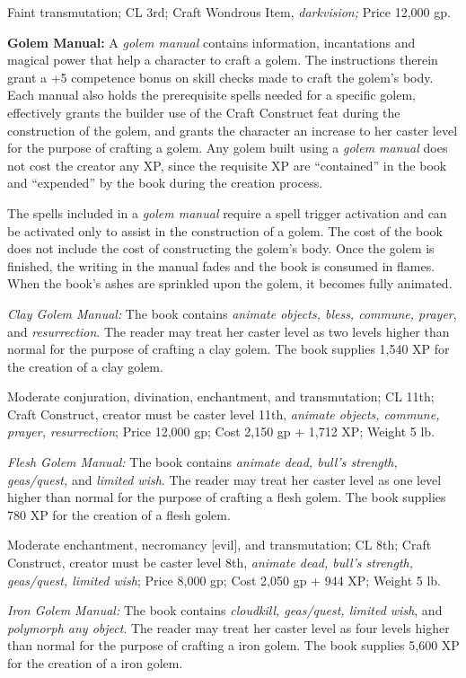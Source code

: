 \documentclass{article}
\begin{document}
Faint transmutation; CL 3rd; Craft Wondrous Item, \textit{darkvision; }Price 12,000 
gp.

\textbf{Golem Manual: }A \textit{golem manual }contains information, incantations 
and magical power that help a character to craft a golem. The instructions therein 
grant a +5 competence bonus on skill checks made to craft the golem's body. Each 
manual also holds the prerequisite spells needed for a specific golem, effectively 
grants the builder use of the Craft Construct feat during the construction of the 
golem, and grants the character an increase to her caster level for the purpose 
of crafting a golem. Any golem built using a \textit{golem manual }does not cost 
the creator any XP, since the requisite XP are ``contained'' in the book and ``expended'' 
by the book during the creation process.

The spells included in a \textit{golem manual }require a spell trigger activation 
and can be activated only to assist in the construction of a golem. The cost of 
the book does not include the cost of constructing the golem's body. Once the golem 
is finished, the writing in the manual fades and the book is consumed in flames. 
When the book's ashes are sprinkled upon the golem, it becomes fully animated.

\textit{Clay Golem Manual: }The book contains \textit{animate objects, bless, commune, 
prayer}, and \textit{resurrection}. The reader may treat her caster level as two 
levels higher than normal for the purpose of crafting a clay golem. The book supplies 
1,540 XP for the creation of a clay golem.

Moderate conjuration, divination, enchantment, and transmutation; CL 11th; Craft 
Construct, creator must be caster level 11th, \textit{animate objects, commune, 
prayer, resurrection}; Price 12,000 gp; Cost 2,150 gp + 1,712 XP; Weight 5 lb.

\textit{Flesh Golem Manual: }The book contains \textit{animate dead, bull's strength, 
geas/quest, }and \textit{limited wish}. The reader may treat her caster level as 
one level higher than normal for the purpose of crafting a flesh golem. The book 
supplies 780 XP for the creation of a flesh golem.

Moderate enchantment, necromancy [evil], and transmutation; CL 8th; Craft Construct, 
creator must be caster level 8th, \textit{animate dead, bull's strength, geas/quest, 
limited wish}; Price 8,000 gp; Cost 2,050 gp + 944 XP; Weight 5 lb.

\textit{Iron Golem Manual: }The book contains \textit{cloudkill, geas/quest, limited 
wish}, and \textit{polymorph any object}. The reader may treat her caster level 
as four levels higher than normal for the purpose of crafting a iron golem. The 
book supplies 5,600 XP for the creation of a iron golem.
\end{document}

